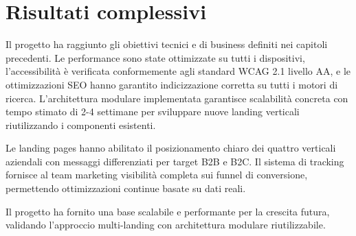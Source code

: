 \section{Risultati complessivi}

Il progetto ha raggiunto gli obiettivi tecnici e di business definiti nei 
capitoli precedenti. Le performance sono state ottimizzate su tutti i dispositivi, 
l'accessibilità è verificata conformemente agli standard WCAG 2.1 livello AA, 
e le ottimizzazioni SEO hanno garantito indicizzazione corretta su tutti i motori 
di ricerca. L'architettura modulare implementata garantisce scalabilità concreta 
con tempo stimato di 2-4 settimane per sviluppare nuove landing verticali 
riutilizzando i componenti esistenti.

Le landing pages hanno abilitato il posizionamento chiaro dei quattro verticali 
aziendali con messaggi differenziati per target B2B e B2C. Il sistema di tracking 
fornisce al team marketing visibilità completa sui funnel di conversione, 
permettendo ottimizzazioni continue basate su dati reali.

\bigskip
Il progetto ha fornito una base scalabile e performante per la crescita futura, 
validando l'approccio multi-landing con architettura modulare riutilizzabile.